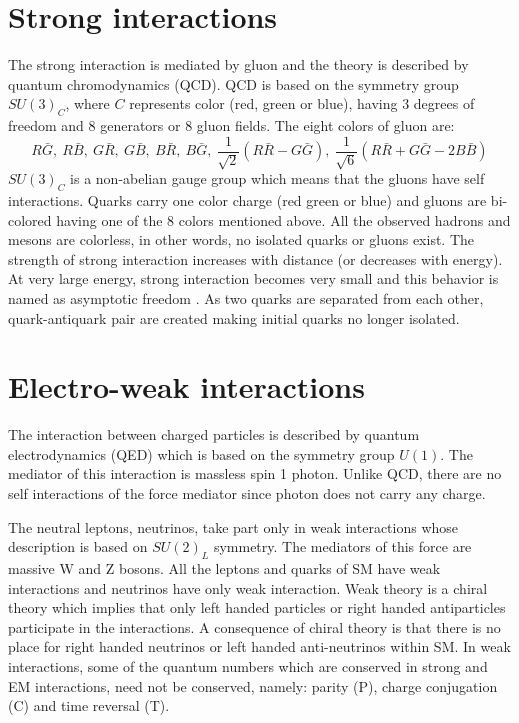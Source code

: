 \section{Strong interactions}
The strong interaction is mediated by gluon and the theory is described by quantum chromodynamics (QCD). QCD is based on the symmetry group $SU(3)_C$, where $C$ represents color (red, green or blue), having 3 degrees of freedom and 8 generators or 8 gluon fields. The eight colors of gluon are:
\begin{equation*}
R\bar{G},\ R\bar{B},\ G\bar{R},\ G\bar{B},\ B\bar{R},\ B\bar{G},\ \frac{1}{\sqrt{2}}(R\bar{R}-G\bar{G}),\ \frac{1}{\sqrt{6}}(R\bar{R}+G\bar{G}-2B\bar{B}) 
\end{equation*}
$SU(3)_C$ is a non-abelian gauge group which means that the gluons have self interactions. Quarks carry one color charge (red green or blue) and gluons are bi-colored having one of the 8 colors mentioned above. All the observed hadrons and mesons are colorless, in other words, no isolated quarks or gluons exist. The strength of strong interaction increases with distance (or decreases with energy). At very large energy, strong interaction becomes very small and this behavior is named as asymptotic freedom \cite{PhysRevLett.30.1343}\cite{PhysRevLett.30.1346}. As two quarks are separated from each other, quark-antiquark pair are created making initial quarks no longer isolated.

\section{Electro-weak interactions}
The interaction between charged particles is described by quantum electrodynamics (QED) which is based on the symmetry group $U(1)$. The mediator of this interaction is massless spin 1 photon. Unlike QCD, there are no self interactions of the force mediator since photon does not carry any charge.

The neutral leptons, neutrinos, take part only in weak interactions whose description is based on $SU(2)_L$ symmetry. The mediators of this force are massive W and Z bosons. All the leptons and quarks of SM have weak interactions and neutrinos have only weak interaction. Weak theory is a chiral theory which implies that only left handed particles or right handed antiparticles participate in the interactions. A consequence of chiral theory is that there is no place for right handed neutrinos or left handed anti-neutrinos within SM. In weak interactions, some of the quantum numbers which are conserved in strong and EM interactions, need not be conserved, namely: parity (P), charge conjugation (C) and time reversal (T).

